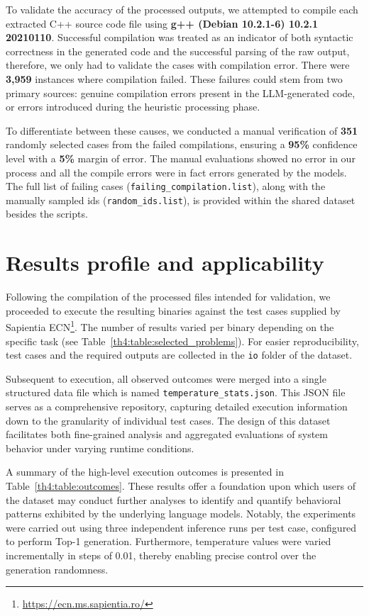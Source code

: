 To validate the accuracy of the processed outputs, we attempted to compile each extracted C++ source code file using {\ttfamily\bfseries g++ (Debian 10.2.1-6) 10.2.1 20210110}.
Successful compilation was treated as an indicator of both syntactic correctness in the generated code and the successful parsing of the raw output, therefore, we only had to validate the cases with compilation error.
There were \textbf{3,959} instances where compilation failed.
These failures could stem from two primary sources: genuine compilation errors present in the LLM-generated code, or errors introduced during the heuristic processing phase.

To differentiate between these causes, we conducted a manual verification of \textbf{351} randomly selected cases from the failed compilations, ensuring a \textbf{95\%} confidence level with a \textbf{5\%} margin of error.
The manual evaluations showed no error in our process and all the compile errors were in fact errors generated by the models.
The full list of failing cases (\texttt{failing\_compilation.list}), along with the manually sampled ids (\texttt{random\_ids.list}), is provided within the shared dataset besides the scripts.

\section{Results profile and applicability}
\label{th4:sec:results_profile}

Following the compilation of the processed files intended for validation, we proceeded to execute the resulting binaries against the test cases supplied by Sapientia ECN\footnote{\url{https://ecn.ms.sapientia.ro/}}.
The number of results varied per binary depending on the specific task (see Table~\ref{th4:table:selected_problems}).
For easier reproducibility, test cases and the required outputs are collected in the \texttt{io} folder of the dataset.

Subsequent to execution, all observed outcomes were merged into a single structured data file which is named \texttt{temperature\_stats.json}.
This JSON file serves as a comprehensive repository, capturing detailed execution information down to the granularity of individual test cases.
The design of this dataset facilitates both fine-grained analysis and aggregated evaluations of system behavior under varying runtime conditions.

A summary of the high-level execution outcomes is presented in Table~\ref{th4:table:outcomes}.
These results offer a foundation upon which users of the dataset may conduct further analyses to identify and quantify behavioral patterns exhibited by the underlying language models.
Notably, the experiments were carried out using three independent inference runs per test case, configured to perform Top-1 generation.
Furthermore, temperature values were varied incrementally in steps of 0.01, thereby enabling precise control over the generation randomness.


